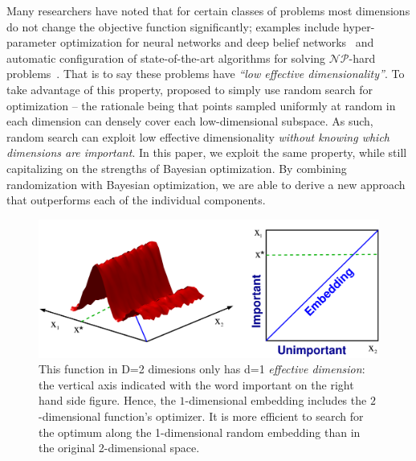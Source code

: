 \documentclass{article}
\begin{document}
Many researchers have noted that for certain classes of problems most dimensions do not change the objective function significantly; examples include hyper-parameter optimization for neural networks and deep belief networks~\cite{Bergstra:2012} and automatic configuration of 
state-of-the-art algorithms for solving $\mathcal{NP}$-hard problems~\cite{Hutter:2013_KeyParameters}.
That is to say these problems have \emph{``low effective dimensionality''}. To take advantage of this property, \cite{Bergstra:2012} proposed to simply use random search for optimization -- the rationale being that points sampled uniformly at random in each dimension can densely cover each low-dimensional subspace. As such, random search can exploit low effective dimensionality \emph{without knowing which dimensions are important}. In this paper, we exploit the same property, while still capitalizing on the strengths of Bayesian optimization. By combining randomization with Bayesian optimization, we are able to derive a new approach that outperforms each of the individual components.



\begin{figure}[tb]
  \includegraphics[scale=0.16]{figures/2to1embedding.pdf}
  \centering
  \caption{This function in D=2 dimesions only has d=1 \emph{effective dimension}: the vertical axis indicated with the word important on the right hand side figure. Hence, the $1$-dimensional embedding includes the $2$-dimensional function's optimizer. It is more efficient to search for the optimum along the 1-dimensional random embedding than in the original 2-dimensional space.}
  \label{fig:simple_embedding}
  \vspace*{-4mm}
\end{figure}
\end{document}
